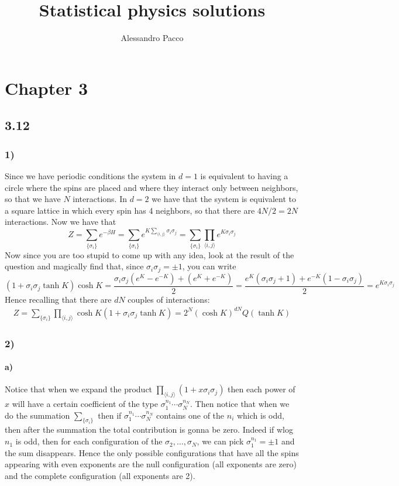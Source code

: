\documentclass[10pt,a4paper]{book}
\author{Alessandro Pacco}
\title{Statistical physics solutions}
\begin{document}
 
\maketitle

\chapter*{Chapter 3}
\section*{3.12}

\subsection*{1)}
Since we have periodic conditions the system in $d=1$ is equivalent to having a circle where the spins are placed and where they interact only between neighbors, so that we have $N$ interactions. In $d=2$ we have that the system is equivalent to a square lattice in which every spin has 4 neighbors, so that there are $4N/2=2N$ interactions.
Now we have that
$$Z=\sum_{\{\sigma_i\}}e^{-\beta H}=\sum_{\{\sigma_i\}}e^{K\sum_{\langle i,j\rangle} \sigma_i\sigma_j}=\sum_{\{\sigma_i\}}\prod_{\langle i,j\rangle}e^{K\sigma_i\sigma_j}
$$
Now since you are too stupid to come up with any idea, look at the result of the question and magically find that, since $\sigma_i\sigma_j=\pm 1$, you can write 
$$(1+\sigma_i\sigma_j\tanh K)\cosh K=\frac{\sigma_i\sigma_j(e^K-e^{-K})+(e^K+e^{-K})}{2}=\frac{e^K(\sigma_i\sigma_j+1)+e^{-K}(1-\sigma_i\sigma_j)}{2}=e^{K\sigma_i\sigma_j}$$
Hence recalling that there are $dN$ couples of interactions:
\begin{align*}
Z=\sum_{\{\sigma_i\}}\prod_{\langle i,j\rangle}\cosh K(1+\sigma_i\sigma_j\tanh K)=2^N(\cosh K)^{dN}Q(\tanh K)
\end{align*}


\subsection*{2)}
\subsubsection*{a)}
Notice that when we expand the product $\prod_{\langle i,j\rangle}(1+x\sigma_i\sigma_j)$ then each power of $x$ will have a certain coefficient of the type $\sigma_1^{n_1}\cdots \sigma_N^{n_N}$. Then notice that when we do the summation $\sum_{\{\sigma_i\}}$ then if $\sigma_1^{n_1}\cdots \sigma_N^{n_N}$ contains one of the $n_i$ which is odd, then after the summation the total contribution is gonna be zero. Indeed if wlog $n_1$ is odd, then for each configuration of the $\sigma_2,\ldots,\sigma_N$, we can pick $\sigma_1^{n_1}=\pm 1$ and the sum disappears. Hence the only possible configurations that have all the spins appearing with even exponents are the null configuration (all exponents are zero) and the complete configuration (all exponents are 2). 
\end{document}

